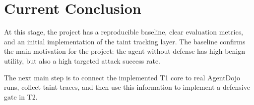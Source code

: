 \documentclass[11pt,a4paper]{article}
\begin{document}
\section{Current Conclusion}

At this stage, the project has a reproducible baseline, clear evaluation metrics, and an initial implementation of the taint tracking layer. The baseline confirms the main motivation for the project: the agent without defense has high benign utility, but also a high targeted attack success rate.

The next main step is to connect the implemented T1 core to real AgentDojo runs, collect taint traces, and then use this information to implement a defensive gate in T2.
\end{document}
